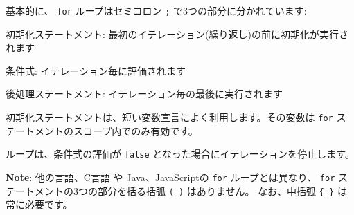 基本的に、 \texttt{for} ループはセミコロン \texttt{;} で3つの部分に分かれています:

\begin{description}
  \item 初期化ステートメント: 最初のイテレーション(繰り返し)の前に初期化が実行されます
  \item 条件式: イテレーション毎に評価されます
  \item 後処理ステートメント: イテレーション毎の最後に実行されます
  \item 初期化ステートメントは、短い変数宣言によく利用します。その変数は \texttt{for} ステートメントのスコープ内でのみ有効です。
\end{description}

ループは、条件式の評価が \texttt{false} となった場合にイテレーションを停止します。

\textbf{Note}: 他の言語、C言語 や Java、JavaScriptの \texttt{for} ループとは異なり、
\texttt{for} ステートメントの3つの部分を括る括弧 \texttt{( )} はありません。
なお、中括弧 \texttt{\{ \}} は常に必要です。